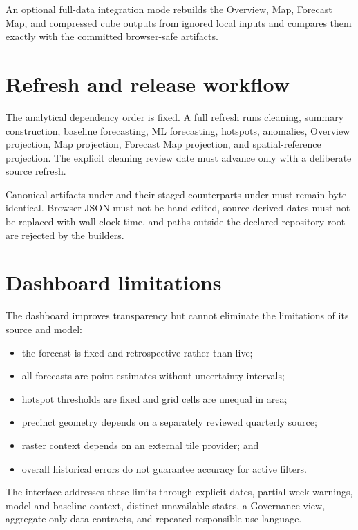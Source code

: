 \documentclass[11pt,oneside]{report}
\begin{document}
An optional full-data integration mode rebuilds the Overview, Map, Forecast Map,
and compressed cube outputs from ignored local inputs and compares them exactly
with the committed browser-safe artifacts.

\section{Refresh and release workflow}

The analytical dependency order is fixed. A full refresh runs cleaning,
summary construction, baseline forecasting, ML forecasting, hotspots,
anomalies, Overview projection, Map projection, Forecast Map projection, and
spatial-reference projection. The explicit cleaning review date must advance
only with a deliberate source refresh.

Canonical artifacts under  and their staged counterparts
under  must remain byte-identical. Browser JSON
must not be hand-edited, source-derived dates must not be replaced with wall
clock time, and paths outside the declared repository root are rejected by the
builders.

\section{Dashboard limitations}

The dashboard improves transparency but cannot eliminate the limitations of its
source and model:

\begin{itemize}
  \item the forecast is fixed and retrospective rather than live;
  \item all forecasts are point estimates without uncertainty intervals;
  \item hotspot thresholds are fixed and grid cells are unequal in area;
  \item precinct geometry depends on a separately reviewed quarterly source;
  \item raster context depends on an external tile provider; and
  \item overall historical errors do not guarantee accuracy for active filters.
\end{itemize}

The interface addresses these limits through explicit dates, partial-week
warnings, model and baseline context, distinct unavailable states, a Governance
view, aggregate-only data contracts, and repeated responsible-use language.
\end{document}

